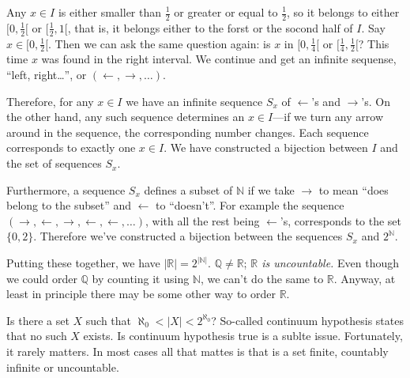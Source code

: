 \documentclass[11pt,oneside,%
]{memoir}
\newenvironment{eqna}{\begin{IEEEeqnarray}{c}}{\end{IEEEeqnarray}\ignorespacesafterend}
\newcommand{\NN}{\mathbb{N}}
\newcommand{\RR}{\mathbb{R}}
\newcommand{\QQ}{\mathbb{Q}}
\begin{document}
Any \(x\in I\) is either smaller than \(\frac{1}{2}\) or greater or equal to \(\frac{1}{2}\), so it belongs to either \([0,\frac{1}{2}[\) or \([\frac{1}{2},1[\), that is, it belongs either to the forst or the socond half of \(I\). Say \(x\in[0,\frac{1}{2}[\). Then we can ask the same question again: is \(x\) in \([0,\frac{1}{4}[\) or \([\frac{1}{4},\frac{1}{2}[\)? This time \(x\) was found in the right interval. We continue and get an infinite sequense, ``left, right\ldots'', or \((\leftarrow,\rightarrow,\dotsc)\).

Therefore, for any \(x\in I\) we have an infinite sequence \(S_x\) of \(\leftarrow\)'s and \(\rightarrow\)'s. On the other hand, any such sequence determines an \(x\in I\)---if we turn any arrow around in the sequence, the corresponding number changes. Each sequence corresponds to exactly one \(x\in I\). We have constructed a bijection between \(I\) and the set of sequences \(S_x\).

Furthermore, a sequence \(S_x\) defines a subset of \(\NN\) if we take \(\rightarrow\) to mean ``does belong to the subset'' and \(\leftarrow\) to ``doesn't''. For example the sequence \((\rightarrow,\leftarrow,\rightarrow,\leftarrow,\leftarrow,\dotsc)\), with all the rest being \(\leftarrow\)'s, corresponds to the set \(\lbrace0,2\rbrace\). Therefore we've constructed a bijection between the sequences \(S_x\) and \(2^\NN\).

Putting these together, we have \(|\RR|=2^{|\NN|}\). \(\QQ\neq\RR\); \emph{\(\RR\) is uncountable.} Even though we could order \(\QQ\) by counting it using \(\NN\), we can't do the same to \(\RR\). Anyway, at least in principle there may be some other way to order \(\RR\).

Is there a set \(X\) such that \(\aleph_0<|X|<2^{\aleph_0}\)? So-called continuum hypothesis states that no such \(X\) exists. Is continuum hypothesis true is a sublte issue. Fortunately, it rarely matters. In most cases all that mattes is that is a set finite, countably infinite or uncountable.

    
\end{document}
